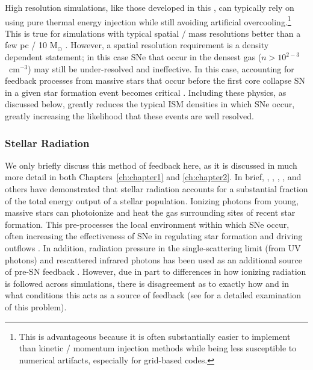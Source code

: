 High resolution simulations, like those developed in this \Dissertation, can typically rely on using pure thermal energy injection while still avoiding artificial overcooling.\footnote{This is advantageous because it is often substantially easier to implement than kinetic / momentum injection methods while being less susceptible to numerical artifacts, especially for grid-based codes.} This is true for simulations with typical spatial / mass resolutions better than a few pc / 10 M$_{\odot}$ \citep{Simpson2015,Hu2018,Smith2018b}. However, a spatial resolution requirement is a density dependent statement; in this case SNe that occur in the densest gas ($n > 10^{2-3}$~cm$^{-3}$) may still be under-resolved and ineffective. In this case, accounting for feedback processes from massive stars that occur before the first core collapse SN in a given star formation event becomes critical \citep{Hu2016}. Including these physics, as discussed below, greatly reduces the typical ISM densities in which SNe occur, greatly increasing the likelihood that these events are well resolved.

\subsubsection{Stellar Radiation}
\label{intro:sec:radiation}

We only briefly discuss this method of feedback here, as it is discussed in much more detail in both Chapters~\ref{ch:chapter1} and \ref{ch:chapter2}. In brief, \cite{Abbott1982}, \cite{Reynolds1990}, \cite{Leitherer1999}, \cite{Agertz2013}, and others have demonstrated that stellar radiation accounts for a substantial fraction of the total energy output of a stellar population. Ionizing photons from young, massive stars can photoionize and heat the gas surrounding sites of recent star formation. This pre-processes the local environment within which SNe occur, often increasing the effectiveness of SNe in regulating star formation and driving outflows \citep{Hu2016}. In addition, radiation pressure in the single-scattering limit (from UV photons) and rescattered infrared photons has been used as an additional source of pre-SN feedback \citep[e.g.][]{FIRE}. However, due in part to differences in how ionizing radiation is followed across simulations, there is disagreement as to exactly how and in what conditions this acts as a source of feedback (see \cite{Krumholz2018} for a detailed examination of this problem).

